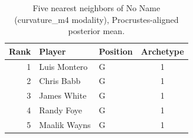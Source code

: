 \begin{table}[htbp]
  \centering\small
  \begin{tabular}{rllc}
    \toprule
    Rank & Player & Position & Archetype \\
    \midrule
    1 & Luis Montero & G & 1 \\
    2 & Chris Babb & G & 1 \\
    3 & James White & G & 1 \\
    4 & Randy Foye & G & 1 \\
    5 & Maalik Wayns & G & 1 \\
    \bottomrule
  \end{tabular}
  \caption{Five nearest neighbors of No Name (curvature_m4 modality), Procrustes-aligned posterior mean.}
  \label{tab:No_Name_neighbors_curvature_m4}
\end{table}

